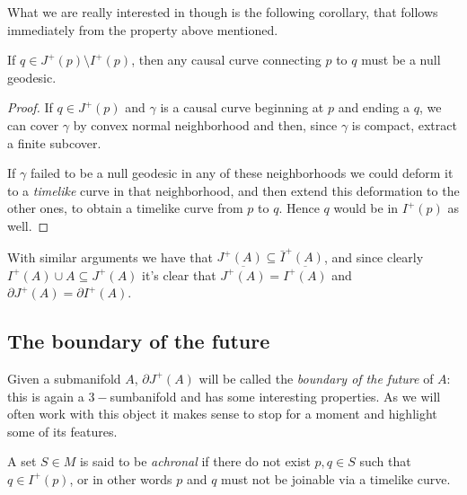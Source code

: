 What we are really interested in though is the following corollary, that follows immediately from the property above mentioned.
\begin{corollary}
	If \(q \in J^+(p) \setminus I^+(p)\), then any causal curve connecting \(p\) to \(q\) must be a null geodesic.
\end{corollary}

\begin{proof}
	If \( q \in J^+(p)\) and \(\gamma\) is a causal curve beginning at \(p\) and ending a \(q\), we can cover \(\gamma\) by convex normal neighborhood and then, since \(\gamma\) is compact, extract a finite subcover.
	
	If \(\gamma\) failed to be a null geodesic in any of these neighborhoods we could deform it to a \emph{timelike} curve in that neighborhood, and then extend this deformation to the other ones, to obtain a timelike curve from \(p\) to \(q\). Hence \(q\) would be in \(I^+(p)\) as well.
\end{proof}

With similar arguments we have that \(J^+(A) \subseteq \bar{I}^+(A)\), and since clearly \(I^+(A) \cup A \subseteq J^+(A)\) it's clear that \(\overline{J^+(A)} = \overline{I^+(A)}\) and \(\partial J^+(A) = \partial I^+(A)\).

\subsection{The boundary of the future}
Given a submanifold \(A\), \(\partial J^+(A)\) will be called the \emph{boundary of the future} of \(A\): this is again a \(3-\)sumbanifold and has some interesting properties. As we will often work with this object it makes sense to stop for a moment and highlight some of its features.

\begin{definition}
	A set \(S\in M\) is said to be \emph{achronal} if there do not exist \(p, q \in S\) such that \(q\in I^+(p)\), or in other words \(p\) and \(q\) must not be joinable via a timelike curve. 
\end{definition}

